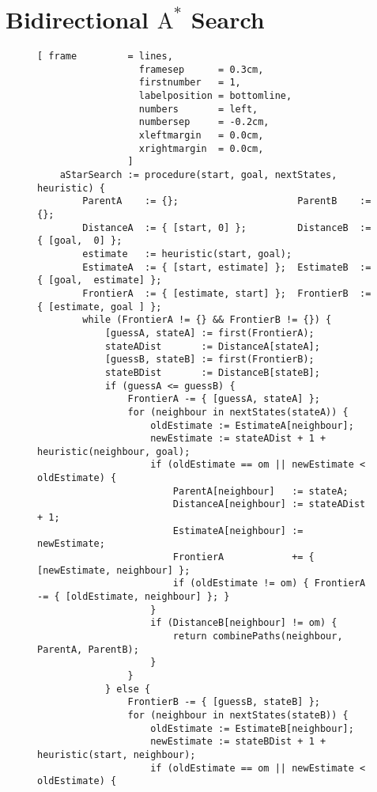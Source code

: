 \section{Bidirectional $\mathrm{A}^*$ Search}
\begin{figure}[!ht]
\centering
\begin{Verbatim}[ frame         = lines, 
                  framesep      = 0.3cm, 
                  firstnumber   = 1,
                  labelposition = bottomline,
                  numbers       = left,
                  numbersep     = -0.2cm,
                  xleftmargin   = 0.0cm,
                  xrightmargin  = 0.0cm,
                ]
    aStarSearch := procedure(start, goal, nextStates, heuristic) {
        ParentA    := {};                     ParentB    := {};                    
        DistanceA  := { [start, 0] };         DistanceB  := { [goal,  0] };
        estimate   := heuristic(start, goal);
        EstimateA  := { [start, estimate] };  EstimateB  := { [goal,  estimate] };  
        FrontierA  := { [estimate, start] };  FrontierB  := { [estimate, goal ] };  
        while (FrontierA != {} && FrontierB != {}) {
            [guessA, stateA] := first(FrontierA);
            stateADist       := DistanceA[stateA];
            [guessB, stateB] := first(FrontierB);
            stateBDist       := DistanceB[stateB];
            if (guessA <= guessB) {
                FrontierA -= { [guessA, stateA] };
                for (neighbour in nextStates(stateA)) {
                    oldEstimate := EstimateA[neighbour];
                    newEstimate := stateADist + 1 + heuristic(neighbour, goal);
                    if (oldEstimate == om || newEstimate < oldEstimate) {
                        ParentA[neighbour]   := stateA;
                        DistanceA[neighbour] := stateADist + 1;
                        EstimateA[neighbour] := newEstimate;
                        FrontierA            += { [newEstimate, neighbour] };
                        if (oldEstimate != om) { FrontierA -= { [oldEstimate, neighbour] }; }
                    }
                    if (DistanceB[neighbour] != om) {
                        return combinePaths(neighbour, ParentA, ParentB);
                    }
                }
            } else {
                FrontierB -= { [guessB, stateB] };
                for (neighbour in nextStates(stateB)) {
                    oldEstimate := EstimateB[neighbour];
                    newEstimate := stateBDist + 1 + heuristic(start, neighbour);
                    if (oldEstimate == om || newEstimate < oldEstimate) {

\end{Verbatim}
\end{figure}
